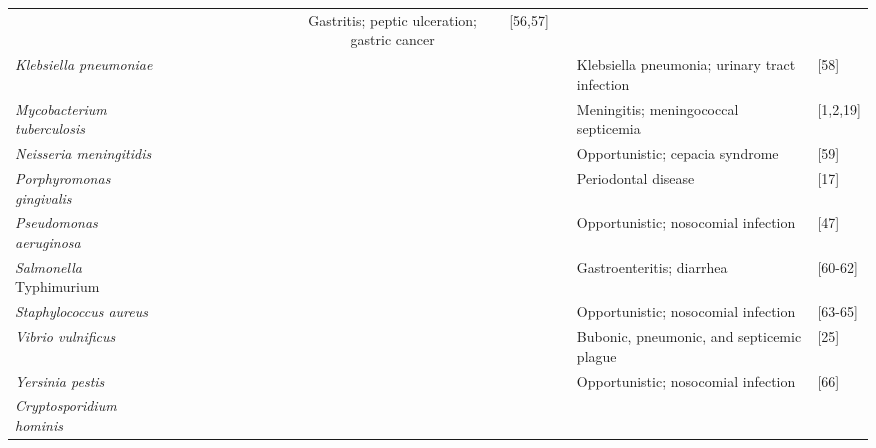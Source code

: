\begin{sidewaystable}
\begin{tabular}{ l  c  c  c  c  c  c  c  c | c  c | c l l }
     \cellcolor[gray]{0.8} & \cellcolor[gray]{0.8} & 
     & & & & \cellcolor[gray]{0.8} & & 
     & Gastritis; peptic ulceration; gastric cancer & [56,57] \\ \cline{2-12}
\textit{Klebsiella pneumoniae} & 
      & & & & & & & & & \cellcolor[gray]{0.8} 
      & & Klebsiella pneumonia; urinary tract infection & [58] \\ \cline{2-12}
\textit{Mycobacterium tuberculosis} & 
     \cellcolor[gray]{0.8} & & \cellcolor[gray]{0.8} 
     & \cellcolor[gray]{0.8} & 
     \cellcolor[gray]{0.8} & \cellcolor[gray]{0.8} 
     & & \cellcolor[gray]{0.8} & \cellcolor[gray]{0.8} & \cellcolor[gray]{0.8} 
     & & Meningitis; meningococcal septicemia & [1,2,19] \\ \cline{2-12}
\textit{Neisseria meningitidis} & 
      & \cellcolor[gray]{0.8} & & & & 
      & & & & \cellcolor[gray]{0.8} & 
      & Opportunistic; cepacia syndrome & [59] \\ \cline{2-12}
\textit{Porphyromonas gingivalis} & 
     \cellcolor[gray]{0.8} & \cellcolor[gray]{0.8} & & & 
     & & & & \cellcolor[gray]{0.8}  & & 
     & Periodontal disease & [17] \\ \cline{2-12}
\textit{Pseudomonas aeruginosa} &
     \cellcolor[gray]{0.8} & & & & & & &  
     & \cellcolor[gray]{0.8} & & & Opportunistic; nosocomial infection & [47] \\ \cline{2-12}
\textit{Salmonella} Typhimurium &
     \cellcolor[gray]{0.8} & & & \cellcolor[gray]{0.8} & 
     \cellcolor[gray]{0.8} & & &  
     & \cellcolor[gray]{0.8} & \cellcolor[gray]{0.8} 
     & & Gastroenteritis; diarrhea & [60-62] \\ \cline{2-12}
\textit{Staphylococcus aureus} & 
     \cellcolor[gray]{0.8} & \cellcolor[gray]{0.8} & & \cellcolor[gray]{0.8} & 
     & & & & \cellcolor[gray]{0.8} & \cellcolor[gray]{0.8} & 
     & Opportunistic; nosocomial infection & [63-65] \\ \cline{2-12}
\textit{Vibrio vulnificus} & 
      & & & & & & \cellcolor[gray]{0.8} & & \cellcolor[gray]{0.8} & \cellcolor[gray]{0.8} 
      & \cellcolor[gray]{0.8} & Bubonic, pneumonic, and septicemic plague & [25] \\ \cline{2-12}
\textit{Yersinia pestis} & 
     \cellcolor[gray]{0.8} & \cellcolor[gray]{0.8} & & \cellcolor[gray]{0.8} & 
     & & & & \cellcolor[gray]{0.8} & & 
     & Opportunistic; nosocomial infection & [66] \\ \cline{2-12}
\textit{Cryptosporidium hominis} & 
     \cellcolor[gray]{0.8} & & & & 
     & & & & \cellcolor[gray]{0.8} & & 

\end{tabular}
\end{sidewaystable}
